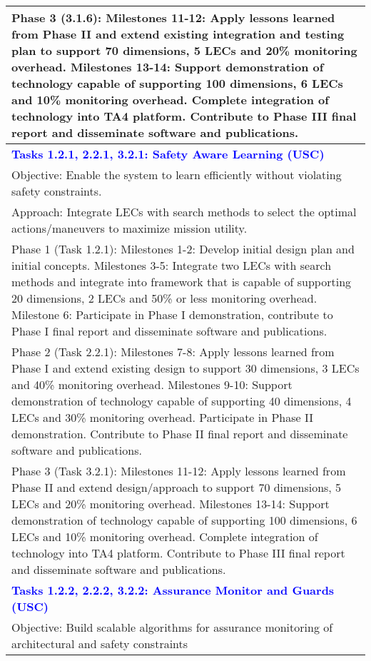 {\begin{longtable} {|p{\textwidth} | }
Phase 3 (3.1.6): Milestones 11-12:  Apply lessons learned from Phase II and extend existing integration and testing plan to support 70 dimensions, 5 LECs and 20\% monitoring overhead.  Milestones 13-14:  Support demonstration of technology capable of supporting 100 dimensions, 6 LECs and 10\% monitoring overhead.  Complete integration of technology into TA4 platform.  Contribute to Phase III final report and disseminate software and publications. \\ \hline
\textcolor{blue} {\footnotesize {\textbf{Tasks 1.2.1, 2.2.1, 3.2.1: Safety Aware Learning (USC)} }}\\ \hline
Objective: Enable the system to learn efficiently without violating safety constraints. \\ \hline
Approach: Integrate LECs with search methods to select the optimal actions/maneuvers to maximize mission utility. \\ \hline
Phase 1 (Task 1.2.1): Milestones 1-2:  Develop initial design plan and initial concepts. Milestones 3-5:  Integrate two LECs with search methods and integrate into framework that is capable of supporting 20 dimensions, 2 LECs and 50\% or less monitoring overhead.   Milestone 6: Participate in Phase I demonstration, contribute to Phase I final report and disseminate software and publications. \\ \hline
Phase 2 (Task 2.2.1): Milestones 7-8:  Apply lessons learned from Phase I and extend existing design to support 30 dimensions, 3 LECs and 40\% monitoring overhead.  Milestones 9-10:  Support demonstration of technology capable of supporting 40 dimensions, 4 LECs and 30\% monitoring overhead.  Participate in Phase II demonstration.  Contribute to Phase II final report and disseminate software and publications. \\ \hline
Phase 3 (Task 3.2.1): Milestones 11-12:  Apply lessons learned from Phase II and extend design/approach to support 70 dimensions, 5 LECs and 20\% monitoring overhead.  Milestones 13-14:  Support demonstration of technology capable of supporting 100 dimensions, 6 LECs and 10\% monitoring overhead. Complete integration of technology into TA4 platform.  Contribute to Phase III final report and disseminate software and publications. \\ \hline
\textcolor{blue} {\footnotesize {\textbf{Tasks 1.2.2, 2.2.2, 3.2.2: Assurance Monitor and Guards (USC)}}} \\ \hline
Objective: Build scalable algorithms for assurance monitoring of architectural and safety constraints \\ \hline

\end{longtable}}
